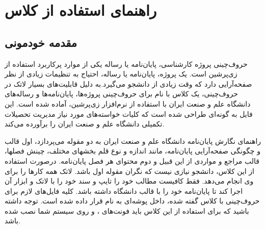 
\chapter{راهنمای استفاده از کلاس}
\thispagestyle{empty}
\section{مقدمه خودمونی}
حروف‌چینی پروژه کارشناسی، پایان‌نامه یا رساله یکی از موارد پرکاربرد استفاده از زی‌پرشین\cite{Khalighi87xepersian} است.  یک پروژه، پایان‌نامه یا رساله،  احتیاج به تنظیمات زیادی از نظر صفحه‌آرایی  دارد که وقت زیادی از دانشجو می‌گیرد.به دلیل قابلیت‌های بسیار لاتک در حروف‌چینی، یک کلاس با نام 
 برای حروف‌چینی پروژه‌ها، پایان‌نامه‌ها و رساله‌های دانشگاه علم و صنعت ایران با استفاده از نرم‌افزار زی‌پرشین،  آماده شده است. این فایل به 
گونه‌ای طراحی شده است که کلیات خواسته‌های مورد نیاز  مدیریت تحصیلات تکمیلی دانشگاه علم و صنعت ایران \cite{IUSTThesisGuide} را برآورده می‌کند.%

راهنمای نگارش پایان‌نامه دانشگاه علم و صنعت ایران به دو مقوله می‌پردازد، اول قالب و چگونگی صفحه‌آرایی پایان‌نامه، مانند اندازه و نوع قلم بخشهای مختلف، چینش فصلها، قالب مراجع و مواردی از این قبیل و دوم محتوای هر فصل پایان‌نامه. 
درصورت استفاده از این کلاس، دانشجو  نیازی نیست که نگران مقوله اول باشد. لاتک همه کارها را برای وی انجام می‌دهد. فقط کافیست مطالب خود را تایپ و سند خود را با لاتک و ابزار آن اجرا کند تا پایان‌نامه خود را با قالب دانشگاه داشته باشد.
کلیه فایل‌های لازم برای حروف‌چینی با کلاس گفته شده، داخل پوشه‌ای به نام
  قرار داده شده است. توجه داشته باشید که برای استفاده از این کلاس باید فونت‌های
  ،
 و
    روی سیستم شما نصب شده باشد.
